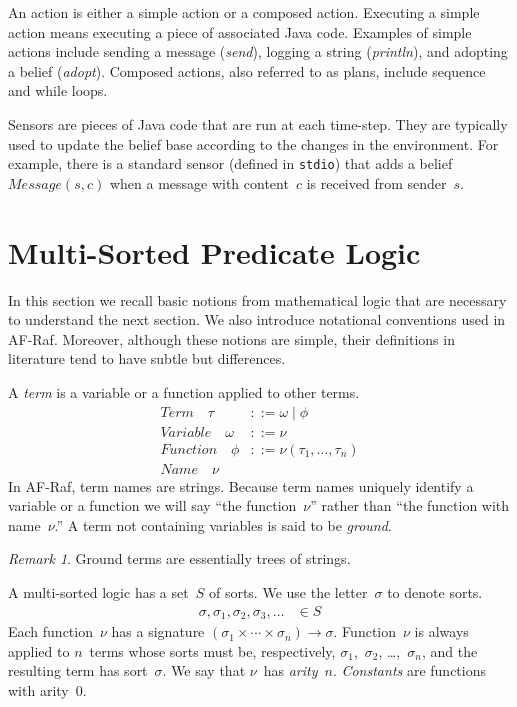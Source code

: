 \documentclass[preprint]{sigplanconf} %
\theoremstyle{remark}
\newtheorem{remark}{Remark}
\begin{document}
An action is either a simple action or a composed action. Executing a
simple action means executing a piece of associated Java code. Examples of
simple actions include sending a message (\textit{send}), logging a string
(\textit{println}), and adopting a belief (\textit{adopt}).  Composed
actions, also referred to as plans, include sequence and while loops.

Sensors are pieces of Java code that are run at each time-step. They are
typically used to update the belief base according to the changes in the
environment. For example, there is a standard sensor (defined in
\texttt{stdio}) that adds a belief $\mathit{Message}(s,c)$ when a message
with content~$c$ is received from sender~$s$.

\section{Multi-Sorted Predicate Logic} \label{sec:multi-sorted} %

In this section we recall basic notions from mathematical logic that are
necessary to understand the next section. We also introduce notational
conventions used in AF-Raf. Moreover, although these notions are simple,
their definitions in literature tend to have subtle but differences.

A \emph{term} is a variable or a function applied to other terms.
\begin{align}
\mathit{Term}\quad\tau &::= \omega \mid \phi \\
\mathit{Variable}\quad\omega &::= \nu \\
\mathit{Function}\quad\phi &::= \nu(\tau_1,\ldots,\tau_n) \\
\mathit{Name}\quad\nu
\end{align}
In AF-Raf, term names are strings.  Because term names uniquely identify a
variable or a function we will say ``the function~$\nu$'' rather than ``the
function with name~$\nu$.'' A term not containing variables is said to be
\emph{ground}.

\begin{remark}
Ground terms are essentially trees of strings.
\end{remark}

A multi-sorted logic has a set~$S$ of sorts.  We use the letter~$\sigma$ to
denote sorts.
\begin{align}
\sigma, \sigma_1, \sigma_2, \sigma_3, \ldots &\in S
\end{align}
Each function~$\nu$ has a signature
$(\sigma_1\times\cdots\times\sigma_n)\to\sigma$.  Function~$\nu$ is always
applied to $n$~terms whose sorts must be, respectively,
$\sigma_1$,~$\sigma_2$, \dots,~$\sigma_n$, and the resulting term has
sort~$\sigma$. We say that $\nu$~has \emph{arity}~$n$. \emph{Constants} are
functions with arity~$0$.
\end{document}
